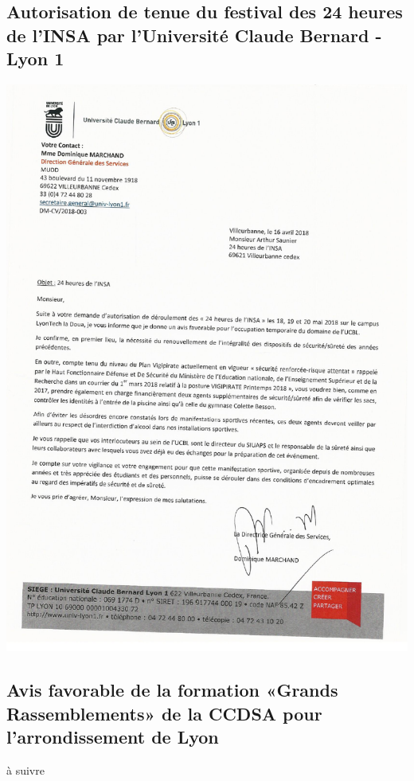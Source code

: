 \documentclass[hidelinks, paper=a4, fontsize=13pt]{report}
\begin{document}
\subsection{Autorisation de tenue du festival des 24 heures de l'INSA par l'Université Claude Bernard - Lyon 1}
\begin{center}
\includegraphics[scale=0.70]{Annexes/Documents/AutorisationUCBL}
\end{center}

\subsection{Avis favorable de la formation «Grands Rassemblements» de la CCDSA pour l’arrondissement de Lyon}
à suivre
\end{document}
